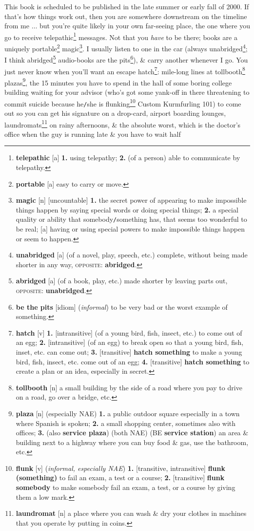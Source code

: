 \documentclass[oneside]{book}
\numberwithin{equation}{section}
\begin{document}
This book is scheduled to be published in the late summer or early fall of 2000. If that's how things work out, then you are somewhere downstream on the timeline from me $\ldots$ but you're quite likely in your own far-seeing place, the one where you go to receive telepathic\footnote{\textbf{telepathic} [a] \textbf{1.} using telepathy; \textbf{2.} (of a person) able to communicate by telepathy.} messages. Not that you \textit{have} to be there; books are a uniquely portable\footnote{\textbf{portable} [a] easy to carry or move.} magic\footnote{\textbf{magic} [n] [uncountable] \textbf{1.} the secret power of appearing to make impossible things happen by saying special words or doing special things; \textbf{2.} a special quality or ability that somebody\texttt{/}something has, that seems too wonderful to be real; [a] having or using special powers to make impossible things happen or seem to happen.}. I usually listen to one in the car (always unabridged\footnote{\textbf{unabridged} [a] (of a novel, play, speech, etc.) complete, without being made shorter in any way, \textsc{opposite}: \textbf{abridged}.}; I think abridged\footnote{\textbf{abridged} [a] (of a book, play, etc.) made shorter by leaving parts out, \textsc{opposite}: \textbf{unabridged}.} audio-books are the pits\footnote{\textbf{be the pits} [idiom] (\textit{informal}) to be very bad or the worst example of something.}), \& carry another whenever I go. You just never know when you'll want an escape hatch\footnote{\textbf{hatch} [v] \textbf{1.} [intransitive] (of a young bird, fish, insect, etc.) to come out of an egg; \textbf{2.} [intransitive] (of an egg) to break open so that a young bird, fish, inset, etc. can come out; \textbf{3.} [transitive] \textbf{hatch something} to make a young bird, fish, insect, etc. come out of an egg; \textbf{4.} [transitive] \textbf{hatch something} to create a plan or an idea, especially in secret.}: mile-long lines at tollbooth\footnote{\textbf{tollbooth} [n] a small building by the side of a road where you pay to drive on a road, go over a bridge, etc.} plazas\footnote{\textbf{plaza} [n] (especially NAE) \textbf{1.} a public outdoor square especially in a town where Spanish is spoken; \textbf{2.} a small shopping center, sometimes also with offices; \textbf{3.} (also \textbf{service plaza}) (both NAE) (BE \textbf{service station}) an area \& building next to a highway where you can buy food \& gas, use the bathroom, etc.}, the 15 minutes you have to spend in the hall of some boring college building waiting for your advisor (who's got some yank-off in there threatening to commit suicide because he\texttt{/}she is flunking\footnote{\textbf{flunk} [v] (\textit{informal, especially NAE}) \textbf{1.} [transitive, intransitive] \textbf{flunk (something)} to fail an exam, a test or a course; \textbf{2.} [transitive] \textbf{flunk somebody} to make somebody fail an exam, a test, or a course by giving them a low mark.} Custom Kurmfurling 101) to come out so you can get his signature on a drop-card, airport boarding lounges, laundromats\footnote{\textbf{laundromat} [n] a place where you can wash \& dry your clothes in machines that you operate by putting in coins.} on rainy afternoons, \& the absolute worst, which is the doctor's office when the guy is running late \& you have to wait half 
\end{document}
